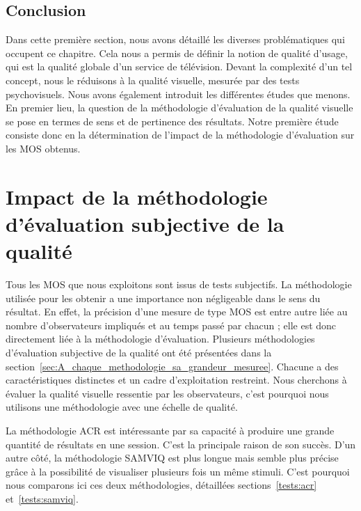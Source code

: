 \subsection{Conclusion}
Dans cette première section, nous avons détaillé les diverses problématiques qui occupent ce chapitre. Cela nous a permis de définir la notion de qualité d'usage, qui est la qualité globale d'un service de télévision. Devant la complexité d'un tel concept, nous le réduisons à la qualité visuelle, mesurée par des tests psychovisuels. Nous avons également introduit les différentes études que menons. En premier lieu, la question de la méthodologie d'évaluation de la qualité visuelle se pose en termes de sens et de pertinence des résultats. Notre première étude consiste donc en la détermination de l'impact de la méthodologie d'évaluation sur les MOS obtenus. %


\section{Impact de la méthodologie d'évaluation subjective de la qualité} \label{sec:impactMéthodÉvalSubj}
Tous les MOS que nous exploitons sont issus de tests subjectifs. La méthodologie utilisée pour les obtenir a une importance non négligeable dans le sens du résultat. En effet, la précision d'une mesure de type MOS est entre autre liée au nombre d'observateurs impliqués et au temps passé par chacun ; elle est donc directement liée à la méthodologie d'évaluation. Plusieurs méthodologies d'évaluation subjective de la qualité ont été présentées dans la section~\ref{sec:A_chaque_methodologie_sa_grandeur_mesuree}. Chacune a des caractéristiques distinctes et un cadre d'exploitation restreint. Nous cherchons à évaluer la qualité visuelle ressentie par les observateurs, c'est pourquoi nous utilisons une méthodologie avec une échelle de qualité.

La méthodologie ACR est intéressante par sa capacité à produire une grande quantité de résultats en une session. C'est la principale raison de son succès. D'un autre côté, la méthodologie SAMVIQ est plus longue mais semble plus précise grâce à la possibilité de visualiser plusieurs fois un même stimuli. C'est pourquoi nous comparons ici ces deux méthodologies, détaillées sections~\ref{tests:acr} et~\ref{tests:samviq}. %

